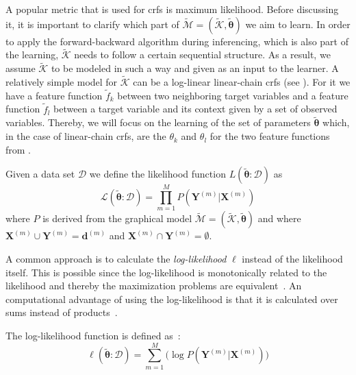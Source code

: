 A popular metric that is used for \glspl{crf} is \gls{maximum likelihood}.
Before discussing it, it is important to clarify which part of $\mathcal{\tilde{M}}=(\mathcal{\tilde{K}},\bm{\tilde{\theta}})$ we aim to learn.
In order to apply the forward-backward algorithm during inferencing, which is also part of the learning, $\mathcal{\tilde{K}}$ needs to follow a certain sequential structure.
As a result, we assume $\mathcal{\tilde{K}}$ to be modeled in such a way and given as an input to the learner.
A relatively simple model for $\mathcal{\tilde{K}}$ can be a log-linear \glspl{linear-chain crf} (see ). For it we have a \gls{feature function} $\tilde{f}_k$ between two neighboring \glspl{target variable} and a \gls{feature function} $\tilde{f}_l$ between a \gls{target variable} and its context given by a set of \glspl{observed variable}.
Thereby, we will focus on the learning of the set of parameters $\bm{\tilde{\theta}}$ which, in the case of \glspl{linear-chain crf}, are the $\theta_k$ and $\theta_l$ for the two \glspl{feature function} from .

\bigskip
Given a data set $\mathcal{D}$ we define the likelihood function $L(\bm{\tilde{\theta}}:\mathcal{D})$ as
\begin{equation}
  \label{equ:likelihood}
  \mathcal{L}(\bm{\tilde{\theta}}:\mathcal{D})=\prod_{m=1}^M P(\bm{Y}^{(m)}|\bm{X}^{(m)})
\end{equation}
where $P$ is derived from the graphical model $\mathcal{\tilde{M}}=(\mathcal{\tilde{K}},\bm{\tilde{\theta}})$ and where $\bm{X}^{(m)}\cup\bm{Y}^{(m)}=\bm{d}^{(m)}$ and $\bm{X}^{(m)}\cap\bm{Y}^{(m)}=\emptyset$.

A common approach is to calculate the \textit{log-likelihood} $\ell$ instead of the likelihood itself.
This is possible since the log-likelihood is monotonically related to the likelihood and thereby the maximization problems are equivalent~\citep{koller2009probabilistic}.
An computational advantage of using the log-likelihood is that it is calculated over sums instead of products~\citep{koller2009probabilistic}.

The log-likelihood function is defined as~\citep{sutton2010introduction}:
\begin{equation}
  \label{equ:log-likelihood}
  \ell(\bm{\tilde{\theta}}:\mathcal{D})=\sum_{m=1}^M \Big(\log P(\bm{Y}^{(m)}|\bm{X}^{(m)})\Big)
\end{equation}


